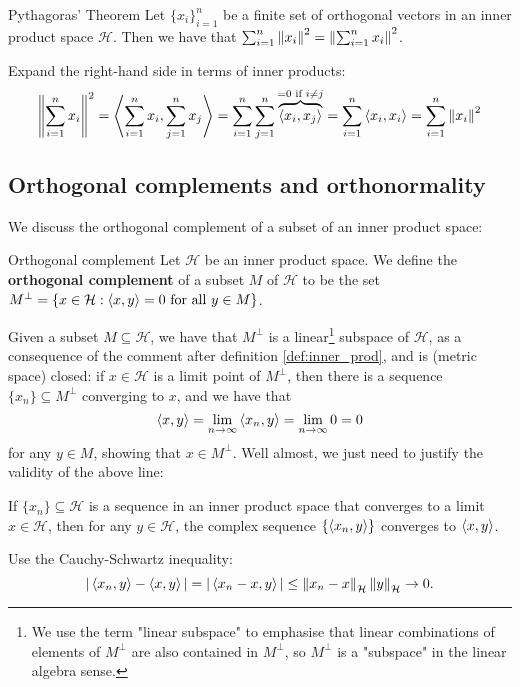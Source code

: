 \begin{btheorem}{Pythagoras' Theorem}{}
Let $\{x_{i}\}_{i=1}^{n}$ be a finite set of orthogonal vectors in an inner product space $\mathcal{H}$. Then we have that \mbox{$\sum_{i=1}^{n}\left\lVert x_{i} \right\rVert^{2} = \left\lVert \sum_{i=1}^{n} x_{i} \right\rVert^{2}$.}
\end{btheorem}
\begin{bproof}{}{}
Expand the right-hand side in terms of inner products: 
\[ \left\lVert \sum_{i=1}^{n} x_{i} \right\rVert^{2} = \left\langle \sum_{i=1}^{n} x_{i}, \sum_{j=1}^{n} x_{j} \right\rangle = \sum_{i=1}^{n} \sum_{j=1}^{n} \overbrace{\left\langle x_{i}, x_{j} \right\rangle}^{ = 0 \text{ if } i\neq j} = \sum_{i=1}^{n} \left\langle x_{i}, x_{i} \right\rangle = \sum_{i=1}^{n} \left\lVert x_{i} \right\rVert^{2} \]
\eop
\end{bproof}

\subsection{Orthogonal complements and orthonormality}
We discuss the orthogonal complement of a subset of an inner product space:
\begin{bdefin}{Orthogonal complement}{}
Let $\mathcal{H}$ be an inner product space. We define the \textbf{orthogonal complement} of a subset $M$ of $\mathcal{H}$ to be the set \mbox{$M^{\perp} = \{ x\in\mathcal{H} : \left\langle x, y \right\rangle = 0 \text{ for all } y\in M \}$.} 
\end{bdefin}
Given a subset $M\subseteq \mathcal{H}$, we have that $M^{\perp}$ is a linear\footnote{We use the term "linear subspace" to emphasise that linear combinations of elements of $M^{\perp}$ are also contained in $M^{\perp}$, so $M^{\perp}$ is a "subspace" in the linear algebra sense.} subspace of $\mathcal{H}$, as a consequence of the comment after definition \ref{def:inner_prod}, and is (metric space) closed: if $x\in\mathcal{H}$ is a limit point of $M^{\perp}$, then there is a sequence \mbox{$\{x_{n}\}\subseteq M^{\perp}$} converging to $x$, and we have that \[ \left\langle x, y \right\rangle = \lim_{n\to\infty} \left\langle x_{n}, y \right\rangle = \lim_{n\to\infty} 0 = 0 \]
for any $y\in M$, showing that $x\in M^{\perp}$. Well almost, we just need to justify the validity of the above line:
\begin{blemma}{}{}
If $\{ x_{n} \}\subseteq\mathcal{H}$ is a sequence in an inner product space that converges to a limit $x\in\mathcal{H}$, then for any $y\in\mathcal{H}$, the complex sequence $\{\left\langle x_{n}, y \right\rangle\}$ converges to $\left\langle x, y \right\rangle$.
\end{blemma}
\begin{bproof}{}{}
Use the Cauchy-Schwartz inequality: \[ |\left\langle x_{n}, y \right\rangle - \left\langle x, y \right\rangle| = |\left\langle x_{n} - x, y \right\rangle| \leq \left\lVert x_{n} - x \right\rVert_{\mathcal{H}} \left\lVert y \right\rVert_{\mathcal{H}} \to 0. \]
\eop
\end{bproof}

